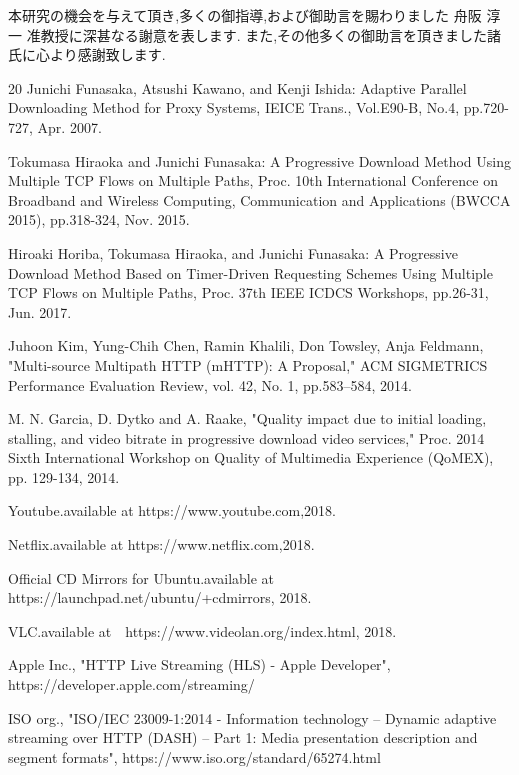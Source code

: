 \documentclass[a4j,12pt]{gradthesis_utf8}
\begin{document}
\clearpage
%
\begin{acknowledgment}
 本研究の機会を与えて頂き,多くの御指導,および御助言を賜わりました
舟阪 淳一 准教授に深甚なる謝意を表します.
また,その他多くの御助言を頂きました諸氏に心より感謝致します.
\end{acknowledgment}
\begin{flushleft}
\begin {thebibliography}{20} 
	Junichi Funasaka, Atsushi Kawano, and Kenji Ishida: Adaptive Parallel Downloading Method for Proxy Systems, IEICE Trans., Vol.E90-B, No.4, pp.720-727, Apr. 2007.
	
	Tokumasa Hiraoka and Junichi Funasaka: A Progressive Download Method Using Multiple TCP Flows on Multiple Paths, Proc. 10th International Conference on Broadband and Wireless Computing, Communication and Applications (BWCCA 2015), pp.318-324, Nov. 2015. 
	
	Hiroaki Horiba, Tokumasa Hiraoka, and Junichi Funasaka: A Progressive Download Method Based on Timer-Driven Requesting Schemes Using Multiple TCP Flows on Multiple Paths, Proc. 37th IEEE ICDCS Workshops, pp.26-31, Jun. 2017.
	
	Juhoon Kim, Yung-Chih Chen, Ramin Khalili, Don Towsley, Anja Feldmann,
	"Multi-source Multipath HTTP (mHTTP): A Proposal,"
	ACM SIGMETRICS Performance Evaluation Review, vol. 42, No. 1, pp.583--584, 2014.
	
	M. N. Garcia, D. Dytko and A. Raake, "Quality impact due to initial loading, stalling, and video bitrate in progressive download video services," Proc. 2014 Sixth International Workshop on Quality of Multimedia Experience (QoMEX), pp. 129-134, 2014.
	
	Youtube.available at https://www.youtube.com,2018.
	
	Netflix.available at https://www.netflix.com,2018.
	
	Official CD Mirrors for Ubuntu.available at https://launchpad.net/ubuntu/+cdmirrors, 2018.
	
	VLC.available at　https://www.videolan.org/index.html, 2018.
	
	Apple Inc., "HTTP Live Streaming (HLS) - Apple Developer", https://developer.apple.com/streaming/
	
	ISO org., "ISO/IEC 23009-1:2014 - Information technology -- Dynamic adaptive streaming over HTTP (DASH) -- Part 1: Media presentation description and segment formats", https://www.iso.org/standard/65274.html
\end {thebibliography}
\end{flushleft}
\end{document}

